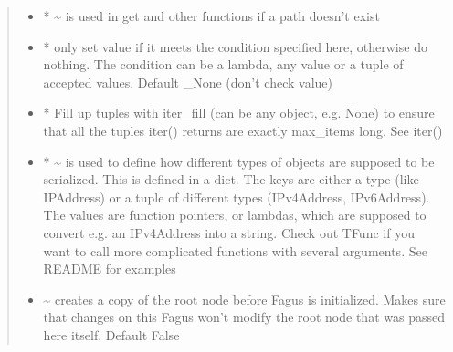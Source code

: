 \documentclass[a4paper,10pt,english]{sphinxmanual}
\begin{document}
\begin{fulllineitems}
\begin{fulllineitems}
\begin{quote}
\begin{description}
\begin{itemize}
\item {}
\sphinxAtStartPar
{} \textendash{} * \textasciitilde{} is used in get and other functions if a path doesn’t exist

\item {}
\sphinxAtStartPar
{} \textendash{} * only set value if it meets the condition specified here, otherwise do nothing. The condition can be
a lambda, any value or a tuple of accepted values. Default \_None (don’t check value)

\item {}
\sphinxAtStartPar
{} \textendash{} * Fill up tuples with iter\_fill (can be any object, e.g. None) to ensure that all the tuples
iter() returns are exactly max\_items long. See iter()

\item {}
\sphinxAtStartPar
{} \textendash{} * \textasciitilde{} is used to define how different types of objects are supposed to be serialized. This is
defined in a dict. The keys are either a type (like IPAddress) or a tuple of different types
(IPv4Address, IPv6Address). The values are function pointers, or lambdas, which are supposed to convert
e.g. an IPv4Address into a string. Check out TFunc if you want to call more complicated functions with
several arguments. See README for examples

\item {}
\sphinxAtStartPar
{} \textendash{} \textasciitilde{} creates a copy of the root node before Fagus is initialized. Makes sure that changes on this Fagus
won’t modify the root node that was passed here itself. Default False

\end{itemize}

\end{description}\end{quote}

\end{fulllineitems}


\begin{fulllineitems}
\label{\detokenize{fagus.fagus:fagus.fagus.Fagus.root}}
\pysigstartsignatures
{}
\pysigstopsignatures
\end{fulllineitems}


\end{fulllineitems}
\end{document}

